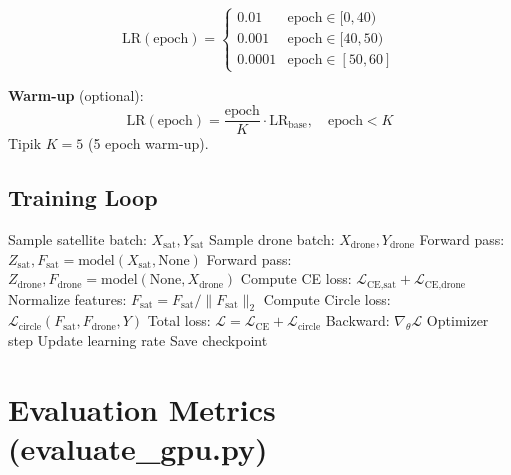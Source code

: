 \documentclass[12pt,a4paper]{article}
\begin{document}
\begin{equation}
    \text{LR}(\text{epoch}) = \begin{cases}
        0.01 & \text{epoch} \in [0, 40) \\
        0.001 & \text{epoch} \in [40, 50) \\
        0.0001 & \text{epoch} \in [50, 60]
    \end{cases}
\end{equation}

\textbf{Warm-up} (optional):
\begin{equation}
    \text{LR}(\text{epoch}) = \frac{\text{epoch}}{K} \cdot \text{LR}_{\text{base}}, \quad \text{epoch} < K
\end{equation}
Tipik $K = 5$ (5 epoch warm-up).

\subsection{Training Loop}

\begin{algorithm}[H]
\caption{Two-View Training}
\begin{algorithmic}[1]
        \STATE Sample satellite batch: $X_{\text{sat}}, Y_{\text{sat}}$
        \STATE Sample drone batch: $X_{\text{drone}}, Y_{\text{drone}}$
        \STATE Forward pass: $Z_{\text{sat}}, F_{\text{sat}} = \text{model}(X_{\text{sat}}, \text{None})$
        \STATE Forward pass: $Z_{\text{drone}}, F_{\text{drone}} = \text{model}(\text{None}, X_{\text{drone}})$
        \STATE Compute CE loss: $\mathcal{L}_{\text{CE,sat}} + \mathcal{L}_{\text{CE,drone}}$
        \STATE Normalize features: $F_{\text{sat}} = F_{\text{sat}} / \|F_{\text{sat}}\|_2$
        \STATE Compute Circle loss: $\mathcal{L}_{\text{circle}}(F_{\text{sat}}, F_{\text{drone}}, Y)$
        \STATE Total loss: $\mathcal{L} = \mathcal{L}_{\text{CE}} + \mathcal{L}_{\text{circle}}$
        \STATE Backward: $\nabla_\theta \mathcal{L}$
        \STATE Optimizer step
    \ENDFOR
    \STATE Update learning rate
    \STATE Save checkpoint
\ENDFOR
\end{algorithmic}
\end{algorithm}

\section{Evaluation Metrics (evaluate\_gpu.py)}
\end{document}

